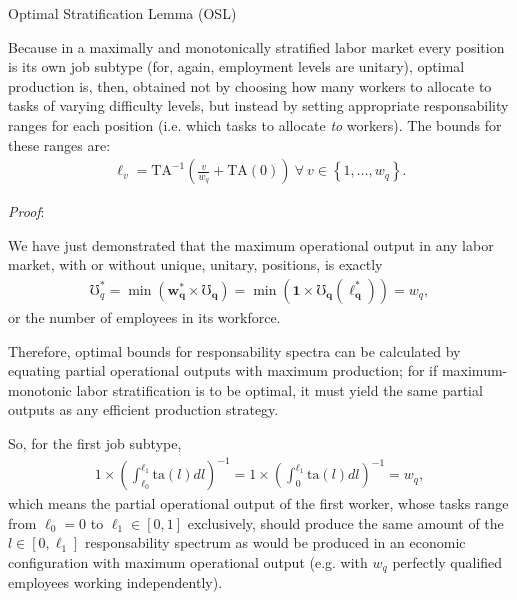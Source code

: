 \documentclass[hidelinks, nonatbib]{elsarticle}
\begin{document}
\begin{enumerate}
Optimal Stratification Lemma (OSL)

Because in a maximally and monotonically stratified labor market every position is its own job subtype (for, again, employment levels are unitary), optimal production is, then, obtained not by choosing how many workers to allocate to tasks of varying difficulty levels, but instead by setting appropriate responsability ranges for each position (i.e. which tasks to allocate \textit{to} workers). The bounds for these ranges are:
\begin{gather}
    \ell_v
    =
    \text{TA}^{-1}\left(
        \frac{v}{w_q}
        +
        \text{TA}(0)
    \right)
    \
    \forall
    \
    v \in 
    \left\{
        1, \dots, w_q
    \right\}
    .
\end{gather}

\textit{Proof}:

We have just demonstrated that the maximum operational output in any labor market, with or without unique, unitary, positions, is exactly 
\begin{gather}
    \mho_{q}^{*}
        =
        \min(
            \boldsymbol{w_{q}^{*}}
            \times
            \boldsymbol{\mho_q}
        )
        = 
        \min(
            \boldsymbol{1}
            \times
            \boldsymbol{\mho_q}(
                \boldsymbol{\ell_{q}^{*}}
            )
        )
        =
        w_q
    ,
\end{gather}
or the number of employees in its workforce.

Therefore, optimal bounds for responsability spectra can be calculated by equating partial operational outputs with maximum production; for if maximum-monotonic labor stratification is to be optimal, it must yield the same partial outputs as any efficient production strategy.

So, for the first job subtype,
\begin{gather}
    1 \times \left(
        \int_{\ell_0}^{\ell_1}
        \text{ta}(l)
        dl
    \right) ^ {-1}
    =
    1 \times \left(
        \int_{0}^{\ell_1}
        \text{ta}(l)
        dl
    \right) ^ {-1}
    =
    w_q
    ,
\end{gather}
which means the partial operational output of the first worker, whose tasks range from $\ell_0 = 0$ to $\ell_1 \in [0,1]$ exclusively, should produce the same amount of the $l \in [0,\ell_1]$ responsability spectrum as would be produced in an economic configuration with maximum operational output (e.g. with $w_q$ perfectly qualified employees working independently).


\end{enumerate}
\end{document}
